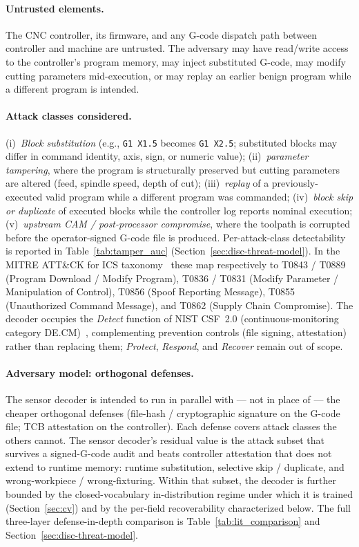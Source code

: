 \documentclass[sensors,article,submit,moreauthors,pdftex]{Definitions/mdpi}
\begin{document}
\paragraph{Untrusted elements.} The CNC controller, its firmware, and any G-code dispatch path between controller and machine are untrusted. The adversary may have read/write access to the controller's program memory, may inject substituted G-code, may modify cutting parameters mid-execution, or may replay an earlier benign program while a different program is intended.

\paragraph{Attack classes considered.} (i)~\emph{Block substitution} (e.g., \texttt{G1 X1.5} becomes \texttt{G1 X2.5}; substituted blocks may differ in command identity, axis, sign, or numeric value); (ii)~\emph{parameter tampering}, where the program is structurally preserved but cutting parameters are altered (feed, spindle speed, depth of cut); (iii)~\emph{replay} of a previously-executed valid program while a different program was commanded; (iv)~\emph{block skip or duplicate} of executed blocks while the controller log reports nominal execution; (v)~\emph{upstream CAM / post-processor compromise}, where the toolpath is corrupted before the operator-signed G-code file is produced. Per-attack-class detectability is reported in Table~\ref{tab:tamper_auc} (Section~\ref{sec:disc-threat-model}). In the MITRE ATT\&CK for ICS taxonomy~\cite{mitre_attack_ics} these map respectively to T0843 / T0889 (Program Download / Modify Program), T0836 / T0831 (Modify Parameter / Manipulation of Control), T0856 (Spoof Reporting Message), T0855 (Unauthorized Command Message), and T0862 (Supply Chain Compromise). The decoder occupies the \emph{Detect} function of NIST CSF~2.0 (continuous-monitoring category DE.CM)~\cite{nistcsf2}, complementing prevention controls (file signing, attestation) rather than replacing them; \emph{Protect}, \emph{Respond}, and \emph{Recover} remain out of scope.

\paragraph{Adversary model: orthogonal defenses.} The sensor decoder is intended to run in parallel with --- not in place of --- the cheaper orthogonal defenses (file-hash / cryptographic signature on the G-code file; TCB attestation on the controller). Each defense covers attack classes the others cannot. The sensor decoder's residual value is the attack subset that survives a signed-G-code audit and beats controller attestation that does not extend to runtime memory: runtime substitution, selective skip / duplicate, and wrong-workpiece / wrong-fixturing. Within that subset, the decoder is further bounded by the closed-vocabulary in-distribution regime under which it is trained (Section~\ref{sec:cv}) and by the per-field recoverability characterized below. The full three-layer defense-in-depth comparison is Table~\ref{tab:lit_comparison} and Section~\ref{sec:disc-threat-model}.
\end{document}
